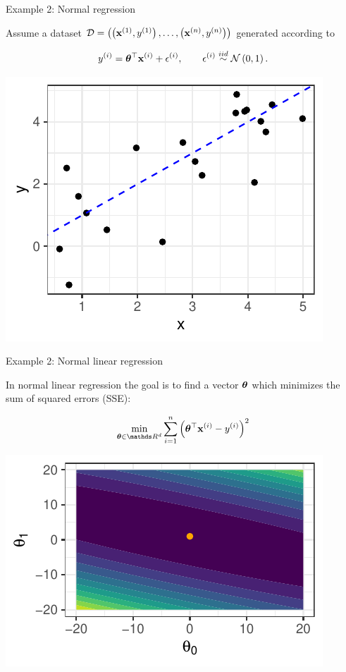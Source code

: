\begin{vbframe}{Example 2: Normal regression}

Assume a dataset $\mathcal{D} = \left( \left(\mathbf{x}^{(1)}, y^{(1)}\right), \ldots, \left(\mathbf{x}^{(n)}, y^{(n)}\right)\right)$ generated according to

$$
y^{(i)} = \bm{\theta}^\top \mathbf{x}^{(i)} + \epsilon^{(i)}, \qquad \epsilon^{(i)} \overset{iid}{\sim} \mathcal{N}\left(0, 1\right).
$$

\begin{center}
	\includegraphics[height=0.4\textwidth, keepaspectratio]{figure_man/ml_linreg_example_1.pdf} 
\end{center}



\end{vbframe}

\begin{vbframe}{Example 2: Normal linear regression} 


In normal linear regression the goal is to find a vector $\bm{\theta}$ which minimizes the sum of squared errors (SSE): 

$$
\min_{\thetab \in \R^d} \sum_{i = 1}^n \left(\thetab^\top \xi - \yi\right)^2
$$

\begin{center}
	\includegraphics[height=0.30\textwidth, keepaspectratio]{figure_man/ml_linreg_example_2.pdf}
\end{center}

\end{vbframe}

